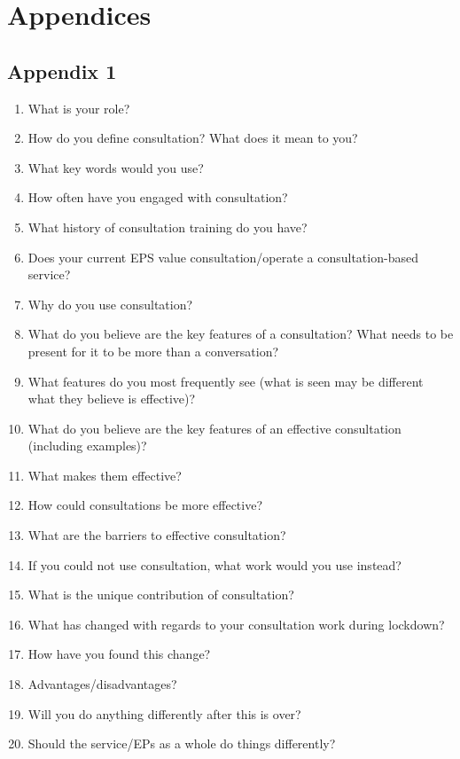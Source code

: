 \documentclass[
  english,
  man]{apa7}
\providecommand{\tightlist}{%
  \setlength{\itemsep}{0pt}\setlength{\parskip}{0pt}}
\begin{document}
\hypertarget{appendices}{%
\section{Appendices}\label{appendices}}

\hypertarget{appendix-1}{%
\subsection{Appendix 1}\label{appendix-1}}

\begin{enumerate}
\def\labelenumi{\arabic{enumi})}
\tightlist
\item
  What is your role?
\item
  How do you define consultation? What does it mean to you?
\item
  What key words would you use?
\item
  How often have you engaged with consultation?
\item
  What history of consultation training do you have?
\item
  Does your current EPS value consultation/operate a
  consultation-based service?
\item
  Why do you use consultation?
\item
  What do you believe are the key features of a consultation? What
  needs to be present for it to be more than a conversation?
\item
  What features do you most frequently see (what is seen may be
  different what they believe is effective)?
\item
  What do you believe are the key features of an effective
  consultation (including examples)?
\item
  What makes them effective?
\item
  How could consultations be more effective?
\item
  What are the barriers to effective consultation?
\item
  If you could not use consultation, what work would you use instead?
\item
  What is the unique contribution of consultation?
\item
  What has changed with regards to your consultation work during
  lockdown?
\item
  How have you found this change?
\item
  Advantages/disadvantages?
\item
  Will you do anything differently after this is over?
\item
  Should the service/EPs as a whole do things differently?
\end{enumerate}
\end{document}
